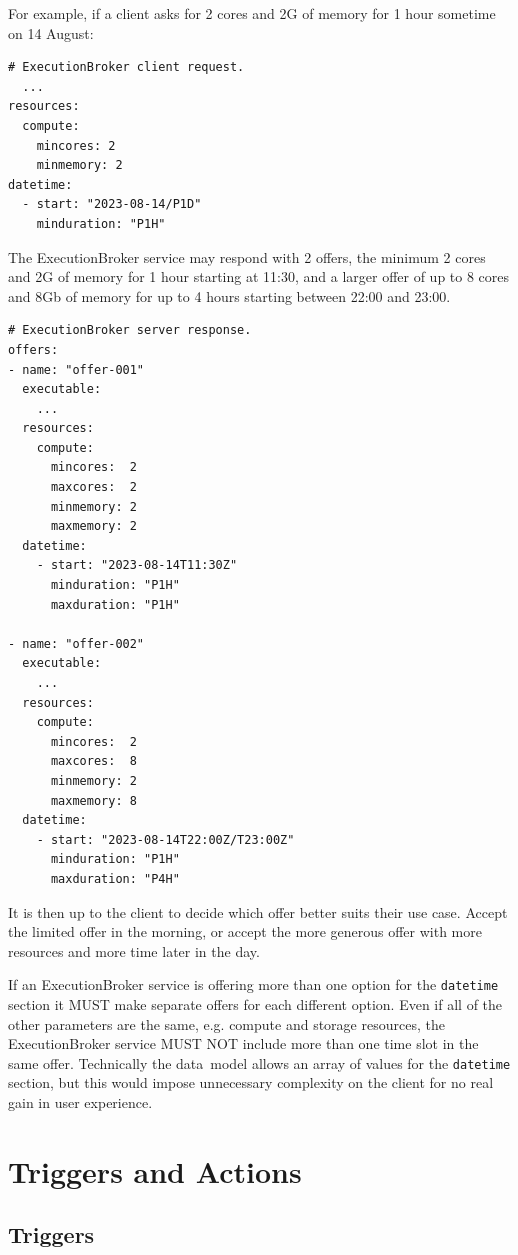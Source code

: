 \documentclass[11pt,a4paper]{ivoa}
\newcommand{\datamodel} {data~model}
\newcommand{\execbrokerclass} {ExecutionBroker}
\newcommand{\codeword}[1] {\texttt{#1}}
\begin{document}
For example, if a client asks for 2 cores and 2G of memory for 1 hour sometime on 14 August:
\begin{lstlisting}[]
# ExecutionBroker client request.
  ...
resources:
  compute:
    mincores: 2
    minmemory: 2
datetime:
  - start: "2023-08-14/P1D"
    minduration: "P1H"
\end{lstlisting}

The  \execbrokerclass{} service may respond with 2 offers,
the minimum 2 cores and 2G of memory for 1 hour starting at 11:30,
and a larger offer of up to 8 cores and 8Gb of memory for up to 4 hours
starting between 22:00 and 23:00.

\begin{lstlisting}[]
# ExecutionBroker server response.
offers:
- name: "offer-001"
  executable:
    ...
  resources:
    compute:
      mincores:  2
      maxcores:  2
      minmemory: 2
      maxmemory: 2
  datetime:
    - start: "2023-08-14T11:30Z"
      minduration: "P1H"
      maxduration: "P1H"

- name: "offer-002"
  executable:
    ...
  resources:
    compute:
      mincores:  2
      maxcores:  8
      minmemory: 2
      maxmemory: 8
  datetime:
    - start: "2023-08-14T22:00Z/T23:00Z"
      minduration: "P1H"
      maxduration: "P4H"
\end{lstlisting}

It is then up to the client to decide which offer better suits their use case.
Accept the limited offer in the morning, or accept the more generous offer with
more resources and more time later in the day.

If an \execbrokerclass{} service is offering more than one option for the \codeword{datetime}
section it MUST make separate offers for each different option.
Even if all of the other parameters are the same, e.g. compute and storage resources, the
\execbrokerclass{} service MUST NOT include more than one time slot in the same offer.
Technically the \datamodel{} allows an array of values for the \codeword{datetime} section,
but this would impose unnecessary complexity on the client for no real gain in user experience.

\section{Triggers and Actions}
\label{triggers-actions}

\subsection{Triggers}
\label{triggers}
\end{document}
